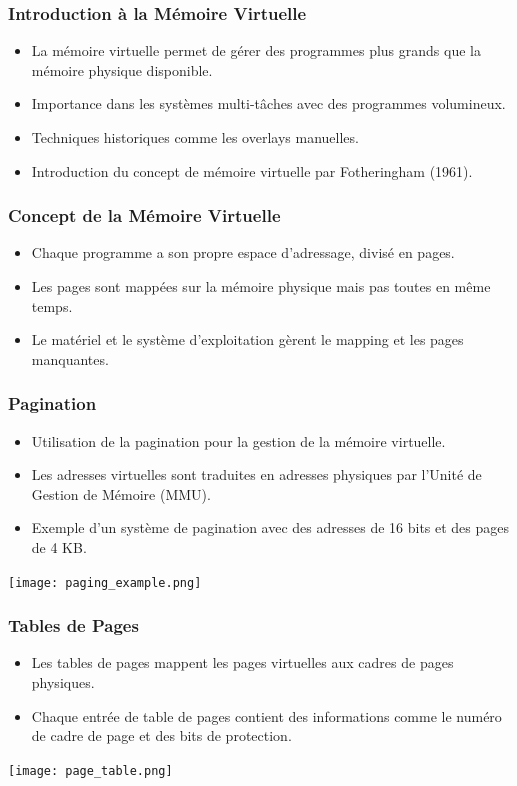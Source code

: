 \documentclass{beamer}
\begin{document}
\begin{frame}
\frametitle{Introduction à la Mémoire Virtuelle}
\begin{itemize}
    \item La mémoire virtuelle permet de gérer des programmes plus grands que la mémoire physique disponible.
    \item Importance dans les systèmes multi-tâches avec des programmes volumineux.
    \item Techniques historiques comme les overlays manuelles.
    \item Introduction du concept de mémoire virtuelle par Fotheringham (1961).
\end{itemize}
\end{frame}


\begin{frame}
\frametitle{Concept de la Mémoire Virtuelle}
\begin{itemize}
    \item Chaque programme a son propre espace d'adressage, divisé en pages.
    \item Les pages sont mappées sur la mémoire physique mais pas toutes en même temps.
    \item Le matériel et le système d'exploitation gèrent le mapping et les pages manquantes.
\end{itemize}
\end{frame}

\begin{frame}
\frametitle{Pagination}
\begin{itemize}
    \item Utilisation de la pagination pour la gestion de la mémoire virtuelle.
    \item Les adresses virtuelles sont traduites en adresses physiques par l'Unité de Gestion de Mémoire (MMU).
    \item Exemple d'un système de pagination avec des adresses de 16 bits et des pages de 4 KB.
\end{itemize}
\texttt{[image: paging\_example.png]}
\end{frame}

\begin{frame}
\frametitle{Tables de Pages}
\begin{itemize}
    \item Les tables de pages mappent les pages virtuelles aux cadres de pages physiques.
    \item Chaque entrée de table de pages contient des informations comme le numéro de cadre de page et des bits de protection.
\end{itemize}
\texttt{[image: page\_table.png]}
\end{frame}
\end{document}
